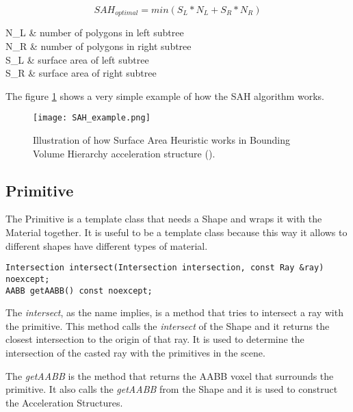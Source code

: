 \begin{equation}
SAH_{optimal} = min(S_L * N_L + S_R * N_R)
\end{equation}

\begin{conditions}
	N_L & number of polygons in left subtree \\
	N_R & number of polygons in right subtree \\
	S_L & surface area of left subtree \\
	S_R & surface area of right subtree \\
\end{conditions}

\par
The figure \ref{SAH.} shows a very simple example of how the SAH algorithm works.

\begin{figure}[H]
	\centering
	\caption{Illustration of how Surface Area Heuristic works in Bounding Volume Hierarchy acceleration structure (\cite{SAH}).}
	\label{SAH.}
	\texttt{[image: SAH\_example.png]}
\end{figure}

\subsection{Primitive}

\par
The Primitive is a template class that needs a Shape and wraps it with the Material together.
It is useful to be a template class because this way it allows to different shapes have different types of material.

\begin{lstlisting}[caption={Main methods in Primitive}, captionpos=b, label=Primitive]
Intersection intersect(Intersection intersection, const Ray &ray) noexcept;
AABB getAABB() const noexcept;
\end{lstlisting}

\par
The \textit{intersect}, as the name implies, is a method that tries to intersect a ray with the primitive.
This method calls the \textit{intersect} of the Shape and it returns the closest intersection to the origin of that ray.
It is used to determine the intersection of the casted ray with the primitives in the scene.

\par
The \textit{getAABB} is the method that returns the AABB voxel that surrounds the primitive.
It also calls the \textit{getAABB} from the Shape and it is used to construct the Acceleration Structures.



